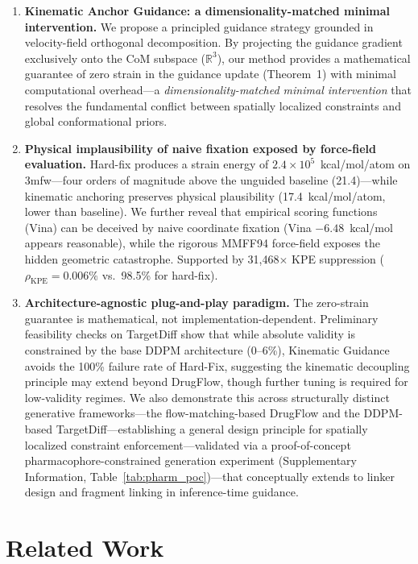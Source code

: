 \documentclass{article}
\newcommand{\KPERatio}{\ensuremath{\rho_{\text{KPE}}}}
\newcommand{\reals}{\ensuremath{\mathbb{R}}}
\begin{document}
\begin{enumerate}[leftmargin=*]
  \item \textbf{Kinematic Anchor Guidance: a dimensionality-matched
    minimal intervention.}  We propose a principled guidance strategy
    grounded in velocity-field orthogonal decomposition.  By projecting
    the guidance gradient exclusively onto the CoM subspace
    ($\reals^3$), our method provides a mathematical guarantee of
    zero strain in the guidance update (Theorem~1) with minimal computational overhead---a
    \emph{dimensionality-matched minimal intervention} that resolves the fundamental conflict between
    spatially localized constraints and global conformational priors.
  \item \textbf{Physical implausibility of naive fixation exposed by
    force-field evaluation.}  Hard-fix produces a strain energy of
    $2.4\times10^5$~kcal/mol/atom on 3mfw---four orders of magnitude
    above the unguided baseline (21.4)---while kinematic anchoring
    preserves physical plausibility (17.4~kcal/mol/atom, lower than
    baseline).  We further reveal that empirical scoring functions
    (Vina) can be deceived by naive coordinate fixation (Vina
    $-6.48$~kcal/mol appears reasonable), while the rigorous MMFF94
    force-field exposes the hidden geometric catastrophe.  Supported
    by 31,468$\times$ KPE suppression ($\KPERatio = 0.006\%$ vs.\
    98.5\% for hard-fix).
  \item \textbf{Architecture-agnostic plug-and-play paradigm.}  The
    zero-strain guarantee is mathematical, not
    implementation-dependent.  Preliminary feasibility checks on TargetDiff show that while absolute validity is constrained by the base DDPM architecture (0--6\%), Kinematic Guidance avoids the 100\% failure rate of Hard-Fix, suggesting the kinematic decoupling principle may extend beyond DrugFlow, though further tuning is required for low-validity regimes.  We also demonstrate this across
    structurally distinct generative frameworks---the
    flow-matching-based DrugFlow and the DDPM-based
    TargetDiff---establishing a general design principle for spatially
    localized constraint enforcement---validated via a proof-of-concept
    pharmacophore-constrained generation experiment (Supplementary
    Information, Table~\ref{tab:pharm_poc})---that conceptually extends to
    linker design and fragment linking in inference-time guidance.
\end{enumerate}

\section{Related Work}
\end{document}
